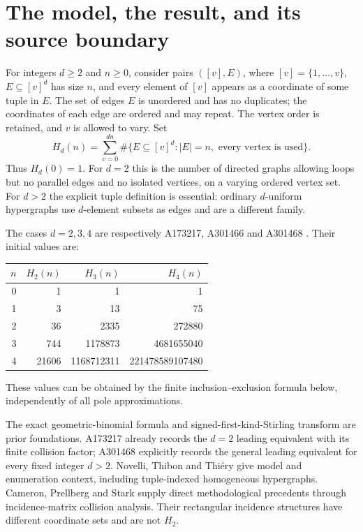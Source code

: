 \documentclass[11pt,a4paper]{article}
\theoremstyle{definition}\newtheorem{definition}[theorem]{Definition}
\theoremstyle{remark}\newtheorem{remark}[theorem]{Remark}
\begin{document}
\section{The model, the result, and its source boundary}
\label{otr:sec:model}
For integers $d\ge2$ and $n\ge0$, consider pairs $([v],E)$, where $[v]=\{1,\ldots,v\}$, $E\subseteq[v]^d$ has size $n$, and every element of $[v]$ appears as a coordinate of some tuple in $E$. The set of edges $E$ is unordered and has no duplicates; the coordinates of each edge are ordered and may repeat. The vertex order is retained, and $v$ is allowed to vary. Set
\[
 H_d(n)=\sum_{v=0}^{dn}\#\{E\subseteq[v]^d:|E|=n,\text{ every vertex is used}\}.
\]
Thus $H_d(0)=1$. For $d=2$ this is the number of directed graphs allowing loops but no parallel edges and no isolated vertices, on a varying ordered vertex set. For $d>2$ the explicit tuple definition is essential: ordinary $d$-uniform hypergraphs use $d$-element subsets as edges and are a different family.

The cases $d=2,3,4$ are respectively A173217, A301466 and A301468 \cite{oeis2,oeis3,oeis4}. Their initial values are:
\begin{center}\small
\begin{tabular}{r r r r}\toprule
$n$&$H_2(n)$&$H_3(n)$&$H_4(n)$\\\midrule
0&1&1&1\\
1&3&13&75\\
2&36&2335&272880\\
3&744&1178873&4681655040\\
4&21606&1168712311&221478589107480\\\bottomrule
\end{tabular}
\end{center}
These values can be obtained by the finite inclusion--exclusion formula below, independently of all pole approximations.

The exact geometric-binomial formula and signed-first-kind-Stirling transform are prior foundations. A173217 already records the $d=2$ leading equivalent with its finite collision factor; A301468 explicitly records the general leading equivalent for every fixed integer $d>2$. Novelli, Thibon and Thi\'ery \cite{ntt} give model and enumeration context, including tuple-indexed homogeneous hypergraphs. Cameron, Prellberg and Stark \cite{cps,cpsclasses} supply direct methodological precedents through incidence-matrix collision analysis. Their rectangular incidence structures have different coordinate sets and are not $H_2$.
\end{document}
